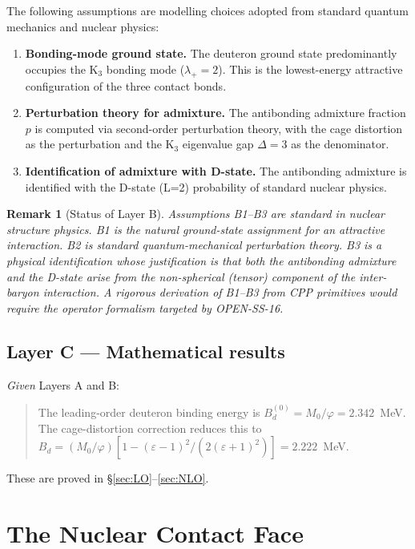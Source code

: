 \documentclass[11pt,letterpaper]{article}
\newtheorem{remark}[theorem]{Remark}
\newcommand{\phig}{\varphi}
\newcommand{\Kthree}{\mathrm{K}_3}
\newcommand{\Mzero}{M_0}
\newcommand{\Bd}{B_d}
\newcommand{\Bdlo}{B_d^{(0)}}
\newcommand{\epscage}{\varepsilon}
\begin{document}
The following assumptions are modelling choices adopted from
standard quantum mechanics and nuclear physics:
\begin{enumerate}[label=(B\arabic*)]
\item \textbf{Bonding-mode ground state.}  The deuteron ground
  state predominantly occupies the $\Kthree$ bonding mode
  ($\lambda_+ = 2$).  This is the lowest-energy attractive
  configuration of the three contact bonds.
\item \textbf{Perturbation theory for admixture.}  The
  antibonding admixture fraction $p$ is computed via
  second-order perturbation theory, with the cage distortion
  as the perturbation and the $\Kthree$ eigenvalue gap
  $\Delta = 3$ as the denominator.
\item \textbf{Identification of admixture with D-state.}  The
  antibonding admixture is identified with the D-state
  (L=2) probability of standard nuclear physics.
\end{enumerate}

\begin{remark}[Status of Layer B]
\label{rem:layerb}
Assumptions B1--B3 are standard in nuclear structure physics.
B1 is the natural ground-state assignment for an attractive
interaction.  B2 is standard quantum-mechanical perturbation
theory.  B3 is a physical identification whose justification
is that both the antibonding admixture and the D-state arise
from the non-spherical (tensor) component of the inter-baryon
interaction.  A rigorous derivation of B1--B3 from CPP
primitives would require the operator formalism targeted by
OPEN-SS-16.
\end{remark}

\subsection{Layer C --- Mathematical results}

\emph{Given} Layers A and B:
\begin{quote}
The leading-order deuteron binding energy is
$\Bdlo = \Mzero/\phig = 2.342$~MeV.  The cage-distortion
correction reduces this to
$\Bd = (\Mzero/\phig)[1 - (\epscage-1)^2/(2(\epscage+1)^2)]
= 2.222$~MeV.
\end{quote}
These are proved in \S\ref{sec:LO}--\ref{sec:NLO}.

\section{The Nuclear Contact Face}
\label{sec:contact}
\end{document}
